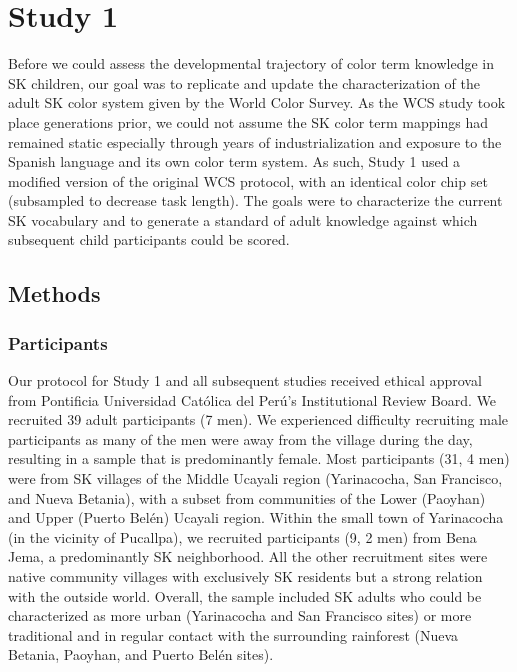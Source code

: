 \documentclass[
  english,
  ,apa7,floatsintext]{apa6}
\begin{document}
\hypertarget{study-1}{%
\section{Study 1}\label{study-1}}

Before we could assess the developmental trajectory of color term knowledge in SK children, our goal was to replicate and update the characterization of the adult SK color system given by the World Color Survey. As the WCS study took place generations prior, we could not assume the SK color term mappings had remained static especially through years of industrialization and exposure to the Spanish language and its own color term system. As such, Study 1 used a modified version of the original WCS protocol, with an identical color chip set (subsampled to decrease task length). The goals were to characterize the current SK vocabulary and to generate a standard of adult knowledge against which subsequent child participants could be scored.

\hypertarget{methods}{%
\subsection{Methods}\label{methods}}

\hypertarget{participants}{%
\subsubsection{Participants}\label{participants}}

Our protocol for Study 1 and all subsequent studies received ethical approval from Pontificia Universidad Católica del Perú's Institutional Review Board. We recruited 39 adult participants (7 men). We experienced difficulty recruiting male participants as many of the men were away from the village during the day, resulting in a sample that is predominantly female. Most participants (31, 4 men) were from SK villages of the Middle Ucayali region (Yarinacocha, San Francisco, and Nueva Betania), with a subset from communities of the Lower (Paoyhan) and Upper (Puerto Belén) Ucayali region. Within the small town of Yarinacocha (in the vicinity of Pucallpa), we recruited participants (9, 2 men) from Bena Jema, a predominantly SK neighborhood. All the other recruitment sites were native community villages with exclusively SK residents but a strong relation with the outside world. Overall, the sample included SK adults who could be characterized as more urban (Yarinacocha and San Francisco sites) or more traditional and in regular contact with the surrounding rainforest (Nueva Betania, Paoyhan, and Puerto Belén sites).
\end{document}
